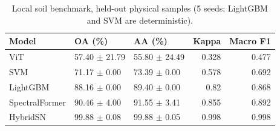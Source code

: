 \begin{table}
\caption{Local soil benchmark, held-out physical samples (5 seeds; LightGBM and SVM are deterministic).}
\label{tab:table_local_benchmark}
\begin{tabular}{lllrr}
\toprule
Model & OA (\%) & AA (\%) & Kappa & Macro F1 \\
\midrule
ViT & 57.40 $\pm$ 21.79 & 55.80 $\pm$ 24.49 & 0.328 & 0.477 \\
SVM & 71.17 $\pm$ 0.00 & 73.39 $\pm$ 0.00 & 0.578 & 0.692 \\
LightGBM & 88.16 $\pm$ 0.00 & 89.40 $\pm$ 0.00 & 0.82 & 0.868 \\
SpectralFormer & 90.46 $\pm$ 4.00 & 91.55 $\pm$ 3.41 & 0.855 & 0.892 \\
HybridSN & 99.88 $\pm$ 0.08 & 99.88 $\pm$ 0.05 & 0.998 & 0.998 \\
\bottomrule
\end{tabular}
\end{table}
